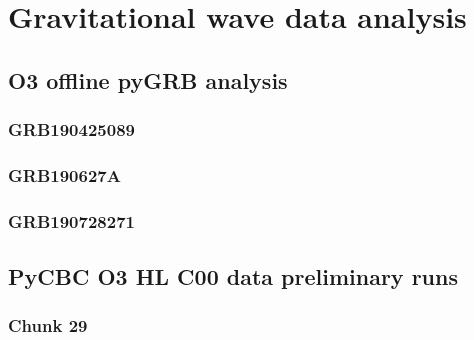 \documentclass[binding=0.6cm, LaM]{sapthesis}
\begin{document}
\chapter{Gravitational wave data analysis}

\section{O3 offline pyGRB analysis}

\subsection{GRB190425089}

\subsection{GRB190627A}

\subsection{GRB190728271}

\section{PyCBC O3 HL C00 data preliminary runs}

\subsection{Chunk 29}













































\end{document}
